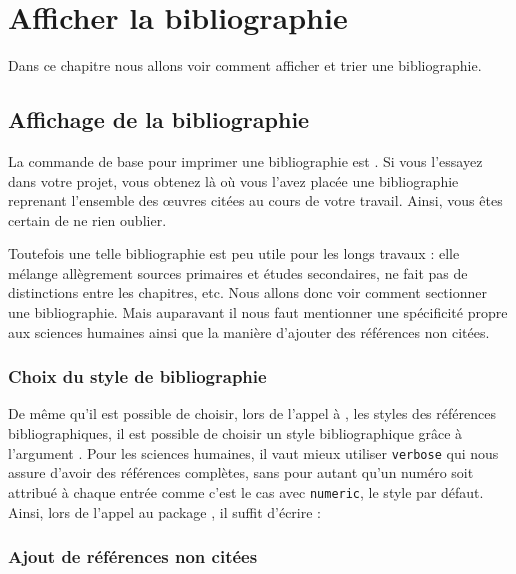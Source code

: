 \chapter{Afficher la bibliographie}

\begin{intro}

Dans ce chapitre nous allons voir comment afficher et trier une bibliographie.
\end{intro}


\section{Affichage de la bibliographie}

La commande de base  pour imprimer une bibliographie est . Si vous l'essayez dans votre projet, vous obtenez là où vous l'avez placée une bibliographie reprenant l'ensemble des œuvres  citées au cours de votre travail. Ainsi, vous êtes certain de ne rien oublier.

Toutefois une telle bibliographie est peu utile pour les longs travaux : elle mélange allègrement sources primaires et études secondaires, ne fait pas de distinctions entre les chapitres, etc. Nous allons donc voir  comment sectionner une bibliographie. Mais auparavant il nous faut mentionner une spécificité propre aux sciences humaines ainsi que la manière d'ajouter des références non citées.



\subsection{Choix du style de bibliographie}

De même qu'il est possible de choisir, lors de l'appel à , les styles des références bibliographiques, il est possible de choisir un style bibliographique grâce à l'argument . Pour les sciences humaines, il vaut mieux utiliser \verb|verbose| qui nous assure d'avoir des références complètes, sans pour autant qu'un numéro soit attribué à chaque entrée comme c'est le cas avec \verb|numeric|, le style par défaut.
Ainsi, lors de l'appel au package , il suffit d'écrire :

\begin{latexcode}
\usepackage[bibstyle=verbose,...]{biblatex}
\end{latexcode}

\subsection{Ajout de références non citées}

